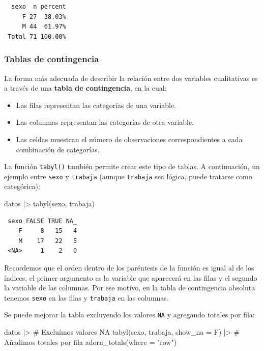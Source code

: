 \documentclass[
  spanish,
  letterpaper,
  DIV=11,
  numbers=noendperiod]{scrreprt}
\newenvironment{Shaded}{\begin{snugshade}}{\end{snugshade}}
\newcommand{\AttributeTok}[1]{\textcolor[rgb]{0.40,0.45,0.13}{#1}}
\newcommand{\CommentTok}[1]{\textcolor[rgb]{0.37,0.37,0.37}{#1}}
\newcommand{\FunctionTok}[1]{\textcolor[rgb]{0.28,0.35,0.67}{#1}}
\newcommand{\NormalTok}[1]{\textcolor[rgb]{0.00,0.23,0.31}{#1}}
\newcommand{\SpecialCharTok}[1]{\textcolor[rgb]{0.37,0.37,0.37}{#1}}
\newcommand{\StringTok}[1]{\textcolor[rgb]{0.13,0.47,0.30}{#1}}
\begin{document}
\begin{verbatim}
  sexo  n percent
     F 27  38.03%
     M 44  61.97%
 Total 71 100.00%
\end{verbatim}

\subsubsection{Tablas de contingencia}\label{tablas-de-contingencia}

La forma más adecuada de describir la relación entre dos variables
cualitativas es a través de una \textbf{tabla de contingencia}, en la
cual:

\begin{itemize}
\item
  Las filas representan las categorías de una variable.
\item
  Las columnas representan las categorías de otra variable.
\item
  Las celdas muestran el número de observaciones correspondientes a cada
  combinación de categorías.
\end{itemize}

La función \texttt{tabyl()} también permite crear este tipo de tablas. A
continuación, un ejemplo entre \texttt{sexo} y \texttt{trabaja} (aunque
\texttt{trabaja} sea lógica, puede tratarse como categórica):

\begin{Shaded}
\begin{Highlighting}[]
\NormalTok{datos }\SpecialCharTok{|\textgreater{}}
  \FunctionTok{tabyl}\NormalTok{(sexo, trabaja)}
\end{Highlighting}
\end{Shaded}

\begin{verbatim}
 sexo FALSE TRUE NA_
    F     8   15   4
    M    17   22   5
 <NA>     1    2   0
\end{verbatim}

Recordemos que el orden dentro de los paréntesis de la función es igual
al de los índices, el primer argumento es la variable que aparecerá en
las filas y el segundo la variable de las columnas. Por ese motivo, en
la tabla de contingencia absoluta tenemos \texttt{sexo} en las filas y
\texttt{trabaja} en las columnas.

Se puede mejorar la tabla excluyendo los valores \texttt{NA} y agregando
totales por fila:

\begin{Shaded}
\begin{Highlighting}[]
\NormalTok{datos }\SpecialCharTok{|\textgreater{}}
  \CommentTok{\# Excluímos valores NA}
  \FunctionTok{tabyl}\NormalTok{(sexo, trabaja, }\AttributeTok{show\_na =}\NormalTok{ F) }\SpecialCharTok{|\textgreater{}}
  \CommentTok{\# Añadimos totales por fila}
  \FunctionTok{adorn\_totals}\NormalTok{(}\AttributeTok{where =} \StringTok{"row"}\NormalTok{)}
\end{Highlighting}
\end{Shaded}
\end{document}
